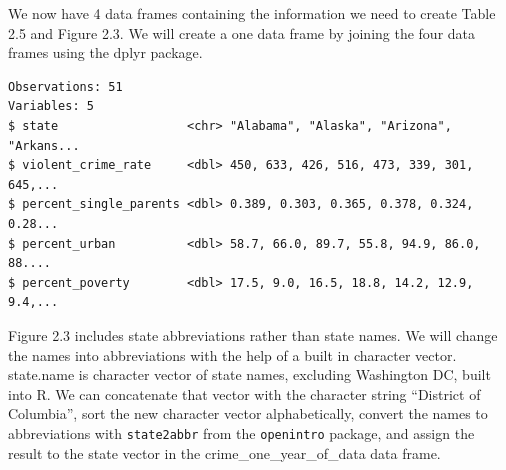 \documentclass[]{book}
\newenvironment{Shaded}{\begin{snugshade}}{\end{snugshade}}
\newcommand{\DecValTok}[1]{\textcolor[rgb]{0.00,0.00,0.81}{#1}}
\newcommand{\KeywordTok}[1]{\textcolor[rgb]{0.13,0.29,0.53}{\textbf{#1}}}
\newcommand{\NormalTok}[1]{#1}
\newcommand{\OperatorTok}[1]{\textcolor[rgb]{0.81,0.36,0.00}{\textbf{#1}}}
\newcommand{\StringTok}[1]{\textcolor[rgb]{0.31,0.60,0.02}{#1}}
\begin{document}
We now have 4 data frames containing the information we need to create Table 2.5 and Figure 2.3. We will create a one data frame by joining the four data frames using the dplyr package.

\begin{Shaded}
\end{Shaded}

\begin{verbatim}
Observations: 51
Variables: 5
$ state                  <chr> "Alabama", "Alaska", "Arizona", "Arkans...
$ violent_crime_rate     <dbl> 450, 633, 426, 516, 473, 339, 301, 645,...
$ percent_single_parents <dbl> 0.389, 0.303, 0.365, 0.378, 0.324, 0.28...
$ percent_urban          <dbl> 58.7, 66.0, 89.7, 55.8, 94.9, 86.0, 88....
$ percent_poverty        <dbl> 17.5, 9.0, 16.5, 18.8, 14.2, 12.9, 9.4,...
\end{verbatim}

Figure 2.3 includes state abbreviations rather than state names. We will change the names into abbreviations with the help of a built in character vector. state.name is character vector of state names, excluding Washington DC, built into R. We can concatenate that vector with the character string ``District of Columbia'', sort the new character vector alphabetically, convert the names to abbreviations with \texttt{state2abbr} from the \texttt{openintro} package, and assign the result to the state vector in the crime\_one\_year\_of\_data data frame.

\begin{Shaded}
\end{Shaded}
\end{document}
